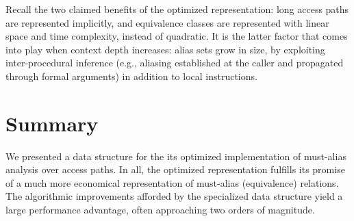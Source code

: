 Recall the two claimed benefits of the optimized representation: long access paths are represented implicitly, and equivalence classes are represented with linear space and time complexity, instead of quadratic. It is the latter factor that comes into play when context depth increases: alias sets grow in size, by exploiting inter-procedural inference (e.g., aliasing established at the caller and propagated through formal arguments) in addition to local instructions.


\section{Summary}

We presented a data structure for the its optimized implementation of must-alias analysis over access paths. In all, the optimized representation fulfills its promise of a much more economical representation of must-alias (equivalence) relations. The algorithmic improvements afforded by the specialized data structure yield a large performance advantage, often approaching two orders of magnitude.
